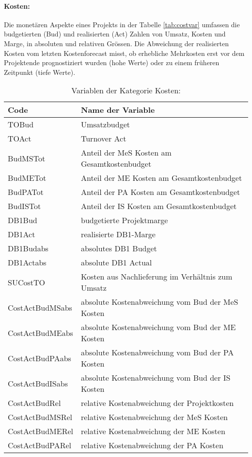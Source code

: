 \paragraph{Kosten:} Die monetären Aspekte eines Projekts in der Tabelle \ref{tab:costvar} umfassen die budgetierten (Bud) und realisierten (Act) Zahlen von Umsatz, Kosten und Marge, in absoluten und relativen Grössen. Die Abweichung der realisierten Kosten vom letzten Kostenforecast misst, ob erhebliche Mehrkosten erst vor dem Projektende prognostiziert wurden (hohe Werte) oder zu einem früheren Zeitpunkt (tiefe Werte). 
\begin{table}[H]
	\centering
	\caption{Variablen der Kategorie Kosten:}
	\begin{tabular}{ll}
		\toprule
		\textbf{Code} & \textbf{Name der Variable} \\
		\midrule
		TOBud & Umsatzbudget \\
		TOAct & Turnover Act \\
		BudMSTot & Anteil der MeS Kosten am Gesamtkostenbudget \\
		BudMETot & Anteil der ME Kosten am Gesamtkostenbudget \\
		BudPATot & Anteil der PA Kosten am Gesamtkostenbudget \\
		BudISTot & Anteil der IS Kosten am Gesamtkostenbudget \\
		DB1Bud & budgetierte  Projektmarge \\
		DB1Act & realisierte DB1-Marge \\
		DB1Budabs & absolutes DB1 Budget  \\
		DB1Actabs & absolute DB1 Actual \\
		SUCostTO & Kosten aus Nachlieferung im Verhältnis zum Umsatz \\
		CostActBudMSabs & absolute Kostenabweichung vom Bud der MeS Kosten \\
		CostActBudMEabs & absolute Kostenabweichung vom Bud der ME Kosten \\
		CostActBudPAabs & absolute Kostenabweichung vom Bud der PA Kosten \\
		CostActBudISabs & absolute Kostenabweichung vom Bud der IS Kosten \\
		CostActBudRel & relative Kostenabweichung  der Projektkosten \\
		CostActBudMSRel & relative Kostenabweichung der MeS Kosten \\
		CostActBudMERel & relative Kostenabweichung der ME Kosten \\
		CostActBudPARel & relative Kostenabweichung der PA Kosten \\

\end{tabular}
\end{table}
